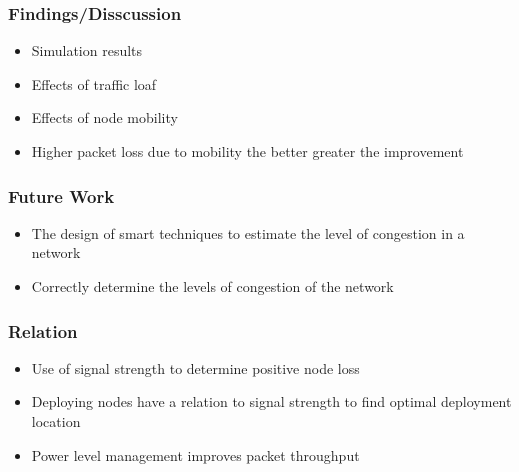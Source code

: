 \begin{frame}[t]
  \frametitle{Findings/Disscussion}
  \begin{itemize}
  \item Simulation results
  \item Effects of traffic loaf
  \item Effects of node mobility
  \item Higher packet loss due to mobility the better greater the improvement
  \end{itemize}

  \vfill

\end{frame}

\begin{frame}[t]
  \frametitle{Future Work}
  \begin{itemize}
  \item The design of smart techniques to estimate the level of congestion in a network
  \item Correctly determine the levels of congestion of the network
  \end{itemize}

  \vfill

\end{frame}

\begin{frame}[t]
  \frametitle{Relation}
  \begin{itemize}
  \item Use of signal strength to determine positive node loss
  \item Deploying nodes have a relation to signal strength to find optimal deployment location
  \item Power level management improves packet throughput
  \end{itemize}

  \vfill

\end{frame}

